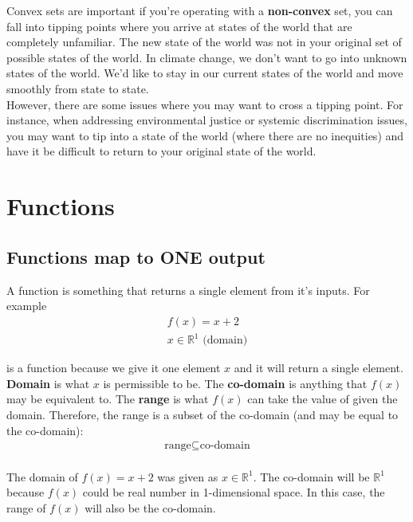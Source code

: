 \documentclass[12pt]{article}
\begin{document}
Convex sets are important if you're operating with a \textbf{non-convex} set, you can fall into tipping points where you arrive at states of the world that are completely unfamiliar. The new state of the world was not in your original set of possible states of the world. In climate change, we don't want to go into unknown states of the world. We'd like to stay in our current states of the world and move smoothly from state to state. \\

However, there are some issues where you may want to cross a tipping point. For instance, when addressing environmental justice or systemic discrimination issues, you may want to tip into a state of the world (where there are no inequities) and have it be difficult to return to your original state of the world. 

\section{Functions}

\subsection{Functions map to ONE output}

A function is something that returns a single element from it's inputs. For example 
\begin{align*}
    f(x) = x+2 \\
x \in \mathbb{R}^1  \text{ (domain)}
\end{align*}

is a function because we give it one element $x$ and it will return a single element. \\

\textbf{Domain} is what $x$ is permissible to be. The \textbf{co-domain} is anything that $f(x)$ may be equivalent to. The \textbf{range} is what $f(x)$ can take the value of given the domain. Therefore, the range is a subset of the co-domain (and may be equal to the co-domain): 
\begin{align*}
    \text{range} \subseteq \text{co-domain}
\end{align*}
\\

The domain of $f(x) = x+2$ was given as $x \in \mathbb{R}^1$. The co-domain will be $\mathbb{R}^1$ because $f(x)$ could be real number in 1-dimensional space. In this case, the range of $f(x)$ will also be the co-domain.\\
\end{document}
